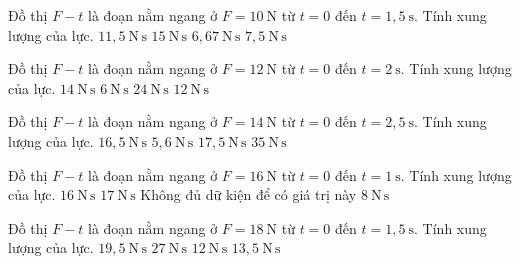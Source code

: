 \begin{ex}
Đồ thị $F-t$ là đoạn nằm ngang ở $F=10\ \mathrm{N}$ từ $t=0$ đến $t=1,5\ \mathrm{s}$. Tính xung lượng của lực.
\choice
{$11,5\ \mathrm{N\,s}$}
{\True $15\ \mathrm{N\,s}$}
{$6,67\ \mathrm{N\,s}$}
{$7,5\ \mathrm{N\,s}$}
\end{ex}

\begin{ex}
Đồ thị $F-t$ là đoạn nằm ngang ở $F=12\ \mathrm{N}$ từ $t=0$ đến $t=2\ \mathrm{s}$. Tính xung lượng của lực.
\choice
{$14\ \mathrm{N\,s}$}
{$6\ \mathrm{N\,s}$}
{\True $24\ \mathrm{N\,s}$}
{$12\ \mathrm{N\,s}$}
\end{ex}

\begin{ex}
Đồ thị $F-t$ là đoạn nằm ngang ở $F=14\ \mathrm{N}$ từ $t=0$ đến $t=2,5\ \mathrm{s}$. Tính xung lượng của lực.
\choice
{$16,5\ \mathrm{N\,s}$}
{$5,6\ \mathrm{N\,s}$}
{$17,5\ \mathrm{N\,s}$}
{\True $35\ \mathrm{N\,s}$}
\end{ex}

\begin{ex}
Đồ thị $F-t$ là đoạn nằm ngang ở $F=16\ \mathrm{N}$ từ $t=0$ đến $t=1\ \mathrm{s}$. Tính xung lượng của lực.
\choice
{\True $16\ \mathrm{N\,s}$}
{$17\ \mathrm{N\,s}$}
{Không đủ dữ kiện để có giá trị này}
{$8\ \mathrm{N\,s}$}
\end{ex}

\begin{ex}
Đồ thị $F-t$ là đoạn nằm ngang ở $F=18\ \mathrm{N}$ từ $t=0$ đến $t=1,5\ \mathrm{s}$. Tính xung lượng của lực.
\choice
{$19,5\ \mathrm{N\,s}$}
{\True $27\ \mathrm{N\,s}$}
{$12\ \mathrm{N\,s}$}
{$13,5\ \mathrm{N\,s}$}
\end{ex}

